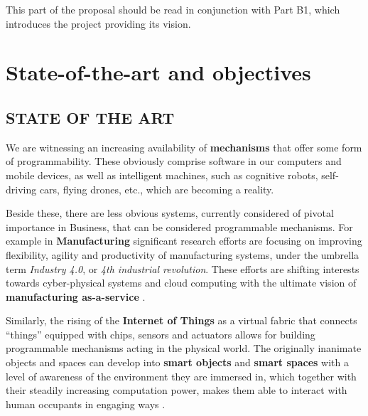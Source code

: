 This part of the proposal should be read in conjunction with Part B1,
which introduces the project providing its vision. 


\section{State-of-the-art and objectives}

\vspace{-1ex}


\subsection{STATE OF THE ART} %

%
\vspace{-1ex}




We are witnessing an increasing availability of \textbf{mechanisms} that offer
some form of programmability. 
These obviously comprise software in our computers and mobile devices,
as well as
intelligent machines, such as cognitive robots, self-driving cars, flying drones, etc., which are becoming a reality. 

Beside these,  there are less obvious systems, currently considered of pivotal importance in Business, that can be considered programmable mechanisms. For
example in \textbf{Manufacturing} significant research efforts are focusing on
improving flexibility, agility and productivity of manufacturing
systems, under the umbrella term \emph{Industry 4.0}, or \emph{4th industrial
revolution}. These efforts are shifting interests towards
cyber-physical systems and cloud computing
with the ultimate vision of \textbf{manufacturing as-a-service} 
\cite{WuRWS15,Lorenz15}. 

Similarly, the rising of the \textbf{Internet of Things} as a
virtual fabric that connects ``things''
equipped with chips, sensors and actuators allows for building
programmable mechanisms acting in the physical world.  The originally
inanimate objects and spaces can develop into \textbf{smart objects}
and \textbf{smart spaces} with a level of awareness of the environment
they are immersed in, which together with their steadily increasing
computation power, makes them able to interact with human occupants
in engaging ways \cite{MacGillivray16,Sailer16}. 


